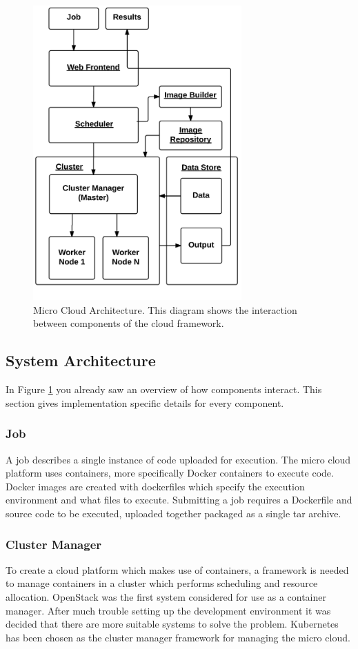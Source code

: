 \documentclass{sig-alternate-05-2015}
\begin{document}
\begin{figure}[h]
\includegraphics[width=8cm]{img/microcloud_architecture}
\caption{Micro Cloud Architecture. This diagram shows the interaction between components of the cloud framework.}
\label{fig:architecture}
\end{figure}

\subsection{System Architecture}
In Figure \ref{fig:architecture} you already saw an overview of how components interact. This section gives implementation specific details for every component.

\subsubsection{Job}
A job describes a single instance of code uploaded for execution. 
The micro cloud platform uses containers, more specifically Docker containers to execute code. Docker images are created with dockerfiles which specify the execution environment and what files to execute. Submitting a job requires a Dockerfile and source code to be executed, uploaded together packaged as a single tar archive.  

\subsubsection{Cluster Manager}
To create a cloud platform which makes use of containers, a framework is needed to manage containers in a cluster which performs scheduling and resource allocation. OpenStack was the first system considered for use as a container manager. After much trouble setting up the development environment it was decided that there are more suitable systems to solve the problem. Kubernetes has been chosen as the cluster manager framework for managing the micro cloud. 
\end{document}
